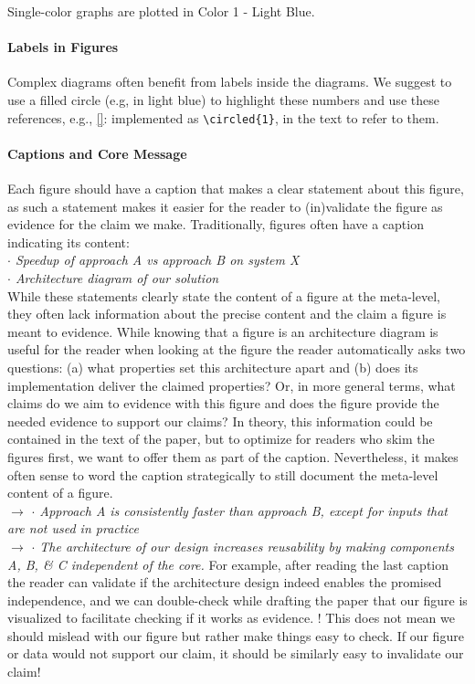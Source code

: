 \documentclass[review, anonymous, acmsmall]{acmart}
\newenvironment{draftonly}{}{}
\DeclareRobustCommand{\circled}[2][]{%
    \ifthenelse{\isempty{#1}}%
        {\circledbase{pairedOneLightBlue}{#2}}%
        {\autoref{#1}: \hyperref[#1]{\circledbase{pairedOneLightBlue}{#2}}}%
}
\begin{document}
\begin{draftonly}
Single-color graphs are plotted in Color 1 - Light Blue.

\paragraph{Labels in Figures}
Complex diagrams often benefit from labels inside the diagrams. We suggest to
use a filled circle (e.g, in light blue) to highlight these numbers and use
these references, e.g., \circled{1} implemented as \texttt{\textbackslash{}circled\{1\}}, in the text to refer to them.

\paragraph{Captions and Core Message}
\label{appendix:captions}

Each figure should have a caption that makes a clear statement about this
figure, as such a statement makes it easier for the reader to (in)validate the
figure as evidence for the claim we make. Traditionally, figures often have a
caption indicating its content:\\ {\color{pairedTwoDarkBlue} \textit{$\cdot$
Speedup of approach A vs approach B on system X}}\\ {\color{pairedTwoDarkBlue}
\textit{$\cdot$ Architecture diagram of our solution}}\\ While these statements
clearly state the content of a figure at the meta-level, they often lack
information about the precise content and the claim a figure is meant to
evidence. While knowing that a figure is an architecture diagram is useful for
the reader when looking at the figure the reader automatically asks two
questions: (a) what properties set this architecture apart and (b) does its
implementation deliver the claimed properties? Or, in more general terms, what
claims do we aim to evidence with this figure and does the figure provide the
needed evidence to support our claims? In theory, this information could be
contained in the text of the paper, but to optimize for readers who skim the
figures first, we want to offer them as part of the caption. Nevertheless, it
makes often sense to word the caption strategically to still document the
meta-level content of a figure.\\ $\to$ {\color{pairedFourDarkGreen}
\textit{$\cdot$ Approach A is consistently faster than approach B, except for
inputs that are not used in practice}}\\ $\to$ {\color{pairedFourDarkGreen}
\textit{$\cdot$ The architecture of our design increases reusability by making
components A, B, \& C independent of the core.}} For example, after reading the
last caption the reader can validate if the architecture design indeed enables
the promised independence, and we can double-check while drafting the paper that
our figure is visualized to facilitate checking if it works as evidence. ! This
does not mean we should mislead with our figure but rather make things easy to
check. If our figure or data would not support our claim, it should be similarly
easy to invalidate our claim!


\end{draftonly}
\end{document}
